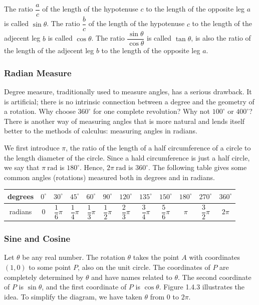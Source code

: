 \documentclass[11pt]{book}
\theoremstyle{break}
\theoremstyle{no_label}
\numberwithin{equation}{section}
\begin{document}
The ratio $\dfrac{a}{c}$ of the length of the hypotenuse $c$ to the length of the opposite leg $a$ is called $\sin\theta$. The ratio $\dfrac{b}{c}$ of the length of the hypotenuse $c$ to the length of the adjecent leg $b$ is called $\cos\theta$. The ratio $\dfrac{\sin\theta}{\cos\theta}$ is called $\tan\theta$, is also the ratio of the length of the adjecent leg $b$ to the length of the opposite leg $a$.

\subsubsection*{Radian Measure}

Degree measure, traditionally used to measure angles, has a serious
drawback. It is artificial; there is no intrinsic connection between a degree and the geometry of a rotation. Why choose $360^\circ$ for one complete revolution? Why not $100^\circ$ or $400^\circ$? There is another way of measuring angles that is more natural and lends itself better to the methods of calculus: measuring angles in radians.

We first introduce $\pi$, the ratio of the length of a half circumference of a circle to the length diameter of the circle. Since a hald circumference is just a half circle, we say that $\pi\ \text{rad}$ is $180^\circ$. Hence, $2\pi\ \text{rad}$ is $360^\circ$. The following table gives some common angles (rotations) measured both in degrees and in radians.

\begin{center}
    \begin{tabular}{|cccccccccccc|}
        \hline
        degrees & $0^\circ$ & $30^\circ$ & $45^\circ$ & $60^\circ$ & $90^\circ$ & $120^\circ$ & $135^\circ$ & $150^\circ$ & $180^\circ$ & $270^\circ$ & $360^\circ$\\
        \hline
        radians & $0$ & $\dfrac{1}{6}\pi$ & $\dfrac{1}{4}\pi$ & $\dfrac{1}{3}\pi$ & $\dfrac{1}{2}\pi$ & $\dfrac{2}{3}\pi$ & $\dfrac{3}{4}\pi$ & $\dfrac{5}{6}\pi$ & $\pi$ & $\dfrac{3}{2}\pi$ & $2\pi$\\[0.2em]
        \hline
    \end{tabular}
\end{center}

\subsubsection*{Sine and Cosine}

Let $\theta$ be any real number. The rotation $\theta$ takes the point $A$ with coordinates $(1, 0)$ to some point $P$, also on the unit circle. The coordinates of $P$ are completely determined by $\theta$ and have names related to $\theta$. The second coordinate of $P$ is $\sin\theta$, and the first coordinate of $P$ is $\cos\theta$. Figure 1.4.3 illustrates the idea. To simplify the diagram, we have taken $\theta$ from $0$ to $2\pi$.
\end{document}

